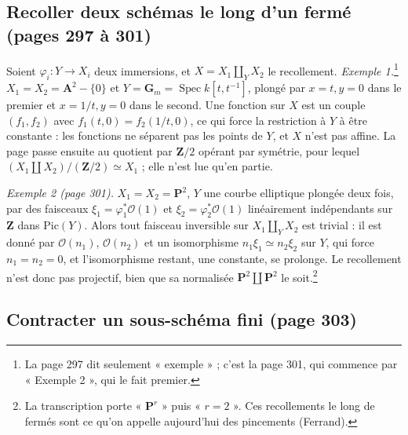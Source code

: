 \documentclass[11pt,a4paper]{article}
\begin{document}
\subsection*{Recoller deux schémas le long d'un fermé (pages 297 à 301)}

Soient $\varphi_i \colon Y \to X_i$ deux immersions, et
$X = X_1 \amalg_Y X_2$ le recollement. \emph{Exemple 1.}\footnote{La page 297
dit seulement « exemple » ; c'est la page 301, qui commence par « Exemple 2 »,
qui le fait premier.} $X_1 = X_2 = \mathbf{A}^2 - \{0\}$
et $Y = \mathbf{G}_m = \operatorname{Spec} k[t, t^{-1}]$, plongé par
$x = t, y = 0$ dans le premier et $x = 1/t, y = 0$ dans le second. Une fonction
sur $X$ est un couple $(f_1, f_2)$ avec $f_1(t, 0) = f_2(1/t, 0)$, ce qui force
la restriction à $Y$ à être constante : les fonctions ne séparent pas les
points de $Y$, et $X$ n'est pas affine. La page passe ensuite au quotient par
$\mathbf{Z}/2$ opérant par symétrie, pour lequel
$(X_1 \amalg X_2)/(\mathbf{Z}/2) \simeq X_1$ ; elle n'est lue qu'en partie.

\emph{Exemple 2 (page 301).} $X_1 = X_2 = \mathbf{P}^2$, $Y$ une courbe
elliptique plongée deux fois, par des faisceaux $\xi_1 = \varphi_1^*\mathcal{O}(1)$
et $\xi_2 = \varphi_2^*\mathcal{O}(1)$ linéairement indépendants sur $\mathbf{Z}$
dans $\mathrm{Pic}(Y)$. Alors tout faisceau inversible sur $X_1 \amalg_Y X_2$
est trivial : il est donné par $\mathcal{O}(n_1)$, $\mathcal{O}(n_2)$ et un
isomorphisme $n_1\xi_1 \simeq n_2\xi_2$ sur $Y$, qui force $n_1 = n_2 = 0$, et
l'isomorphisme restant, une constante, se prolonge. Le recollement n'est donc
pas projectif, bien que sa normalisée $\mathbf{P}^2 \amalg \mathbf{P}^2$ le
soit.\footnote{La transcription porte « $\mathbf{P}^r$ » puis « $r = 2$ ».
Ces recollements le long de fermés sont ce qu'on appelle aujourd'hui des
pincements (Ferrand).}

\subsection*{Contracter un sous-schéma fini (page 303)}
\end{document}
